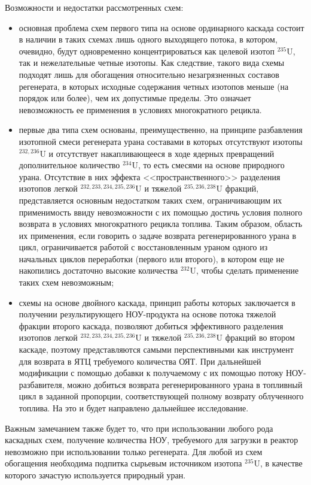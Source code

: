 Возможности и недостатки рассмотренных схем:
\begin{itemize}
  \item основная проблема схем первого типа на основе ординарного каскада состоит в наличии в таких схемах лишь одного выходящего потока, в котором, очевидно, будут одновременно концентрироваться как целевой изотоп $^{235}$U, так и нежелательные четные изотопы. Как следствие, такого вида схемы подходят лишь для обогащения относительно незагрязненных составов регенерата, в которых исходные содержания четных изотопов меньше (на порядок или более), чем их допустимые пределы. Это означает невозможность ее применения в условиях многократного рецикла.
  \item первые два типа схем основаны, преимущественно, на принципе разбавления изотопной смеси регенерата урана составами в которых отсутствуют изотопы $^{232,236}$U и отсутствует накапливающееся в ходе ядерных превращений дополнительное количество $^{234}$U, то есть смесями на основе природного урана. Отсутствие в них эффекта <<пространственного>> разделения изотопов легкой $^{232,233,234,235,236}$U и тяжелой $^{235,236,238}$U фракций, представляется основным недостатком таких схем, ограничивающим их применимость ввиду невозможности с их помощью достичь условия полного возврата в условиях многократного рецикла топлива. Таким образом, область их применения, если говорить о задаче возврата регенерированного урана в цикл, ограничивается работой с восстановленным ураном одного из начальных циклов переработки (первого или второго), в котором еще не накопились достаточно высокие количества $^{232}$U, чтобы сделать применение таких схем невозможным;
  \item схемы на основе двойного каскада, принцип работы которых заключается в получении результирующего НОУ-продукта на основе потока тяжелой фракции второго каскада, позволяют добиться эффективного разделения изотопов легкой $^{232,233,234,235,236}$U и тяжелой $^{235,236,238}$U фракций во втором каскаде, поэтому представляются самыми перспективными как инструмент для возврата в ЯТЦ требуемого количества ОЯТ. При дальнейшей модификации с помощью добавки к получаемому с их помощью потоку НОУ-разбавителя, можно добиться возврата регенерированного урана в топливный цикл в заданной пропорции, соответствующей полному возврату облученного топлива. На это и будет направлено дальнейшее исследование.
\end{itemize}

Важным замечанием также будет то, что при использовании любого рода каскадных схем, получение количества НОУ, требуемого для загрузки в реактор невозможно при использовании только регенерата. Для любой из схем обогащения необходима подпитка сырьевым источником изотопа $^{235}$U, в качестве которого зачастую используется природный уран.